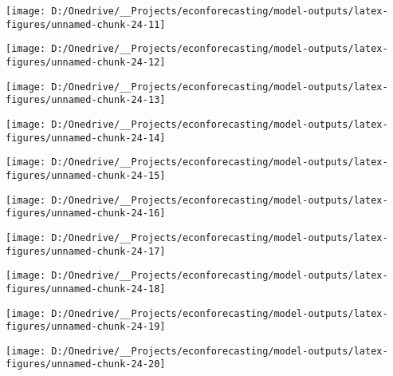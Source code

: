\documentclass[11pt, letterpaper]{article}\usepackage[]{graphicx}\usepackage[]{color}
\begin{document}
{\centering \texttt{[image: D:/Onedrive/\_\_Projects/econforecasting/model-outputs/latex-figures/unnamed-chunk-24-11]} 

}




{\centering \texttt{[image: D:/Onedrive/\_\_Projects/econforecasting/model-outputs/latex-figures/unnamed-chunk-24-12]} 

}




{\centering \texttt{[image: D:/Onedrive/\_\_Projects/econforecasting/model-outputs/latex-figures/unnamed-chunk-24-13]} 

}




{\centering \texttt{[image: D:/Onedrive/\_\_Projects/econforecasting/model-outputs/latex-figures/unnamed-chunk-24-14]} 

}




{\centering \texttt{[image: D:/Onedrive/\_\_Projects/econforecasting/model-outputs/latex-figures/unnamed-chunk-24-15]} 

}




{\centering \texttt{[image: D:/Onedrive/\_\_Projects/econforecasting/model-outputs/latex-figures/unnamed-chunk-24-16]} 

}




{\centering \texttt{[image: D:/Onedrive/\_\_Projects/econforecasting/model-outputs/latex-figures/unnamed-chunk-24-17]} 

}




{\centering \texttt{[image: D:/Onedrive/\_\_Projects/econforecasting/model-outputs/latex-figures/unnamed-chunk-24-18]} 

}




{\centering \texttt{[image: D:/Onedrive/\_\_Projects/econforecasting/model-outputs/latex-figures/unnamed-chunk-24-19]} 

}




{\centering \texttt{[image: D:/Onedrive/\_\_Projects/econforecasting/model-outputs/latex-figures/unnamed-chunk-24-20]} 

}
\end{document}
